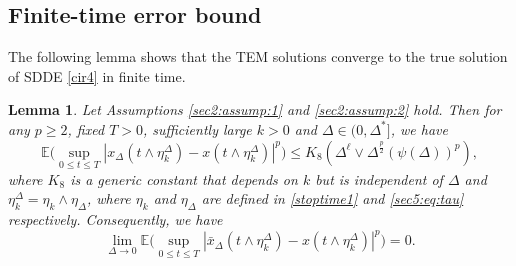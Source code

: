 \documentclass[11pt]{article}
\newtheorem{lemma}[definition]{Lemma}
\begin{document}
\subsection{Finite-time error bound}
The following lemma shows that the TEM solutions converge to the true solution of SDDE \eqref{cir4} in finite time. 
\begin{lemma}\label{eq:l8}
Let Assumptions \ref{sec2:assump:1} and \ref{sec2:assump:2} hold. Then for any $p\geq 2$, fixed $T> 0$, sufficiently large $k>0$ and $\Delta\in (0,\Delta^*]$,  we have
\begin{equation}\label{eq:37}
\mathbb{E}\Big( \sup_{0\leq t \leq T}|x_{\Delta}(t\wedge\eta^{\Delta}_k)-x(t \wedge \eta^{\Delta}_k)|^p  \Big)\le K_8(\Delta^{\ell}\vee\Delta^{\frac{p}{2}}(\psi(\Delta))^p),
\end{equation}
where $K_8$ is a generic constant that depends on $k$ but is independent of $\Delta$ and $\eta^{\Delta}_k=\eta_k\wedge \eta_{\Delta}$, where $\eta_k$ and $\eta_{\Delta}$ are defined in \eqref{stoptime1} and \eqref{sec5:eq:tau} respectively.  Consequently, we have
\begin{equation}\label{eq:38}
\lim_{\Delta\rightarrow 0}\mathbb{E}\Big( \sup_{0\leq t \leq T}|\bar{x}_{\Delta}(t \wedge \eta^{\Delta}_k)-x(t \wedge \eta^{\Delta}_k)|^p \Big)=0.
\end{equation}
\end{lemma}
\end{document}
